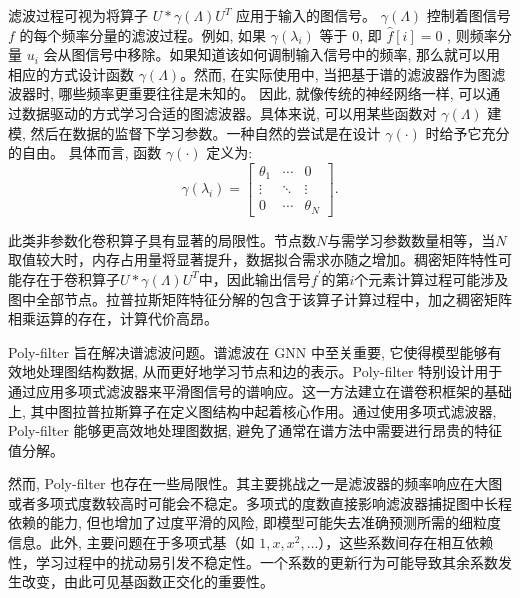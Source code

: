 滤波过程可视为将算子 \(U * \gamma \left( \Lambda \right) {U}^{T}\) 应用于输入的图信号。 \(\gamma \left( \Lambda \right)\) 控制着图信号 \(f\) 的每个频率分量的滤波过程。例如, 如果 \(\gamma \left( {\lambda }_{i}\right)\) 等于 0, 即 \(\widehat{f}\left\lbrack  {i}\right\rbrack   = 0\) , 则频率分量 \({u}_{i}\) 会从图信号中移除。如果知道该如何调制输入信号中的频率, 那么就可以用相应的方式设计函数 \(\gamma \left( \Lambda \right)\)。然而, 在实际使用中, 当把基于谱的滤波器作为图滤波器时, 哪些频率更重要往往是未知的。 因此, 就像传统的神经网络一样, 可以通过数据驱动的方式学习合适的图滤波器。具体来说, 可以用某些函数对 \(\gamma \left( \Lambda \right)\) 建模, 然后在数据的监督下学习参数。一种自然的尝试是在设计 \(\gamma \left( \cdot \right)\) 时给予它充分的自由。 具体而言, 函数 \(\gamma \left( \cdot \right)\) 定义为:
\begin{equation}
\gamma \left( {\lambda }_{i}\right)  = \left\lbrack  \begin{matrix} {\theta }_{1} & \cdots & 0 \\  \vdots &  \ddots  & \vdots \\  0 & \cdots & {\theta }_{N} \end{matrix}\right\rbrack.
\end{equation}

此类非参数化卷积算子具有显著的局限性。节点数\({N}\)与需学习参数数量相等，当\({N}\)取值较大时，内存占用量将显著提升，数据拟合需求亦随之增加。稠密矩阵特性可能存在于卷积算子\(U * \gamma \left( \Lambda \right) {U}^{T}\)中，因此输出信号\({f}^{\prime }\)的第\({i}\)个元素计算过程可能涉及图中全部节点。拉普拉斯矩阵特征分解的包含于该算子计算过程中，加之稠密矩阵相乘运算的存在，计算代价高昂。

Poly-filter \parencite{2021_Han_Dynamic_and_multi_faceted_spatio_temporal_deep_learning_for_traffic_speed_forecasting} 旨在解决谱滤波问题。谱滤波在 GNN 中至关重要, 它使得模型能够有效地处理图结构数据, 从而更好地学习节点和边的表示。Poly-filter 特别设计用于通过应用多项式滤波器来平滑图信号的谱响应。这一方法建立在谱卷积框架的基础上, 其中图拉普拉斯算子在定义图结构中起着核心作用。通过使用多项式滤波器, Poly-filter 能够更高效地处理图数据, 避免了通常在谱方法中需要进行昂贵的特征值分解。

然而, Poly-filter 也存在一些局限性。其主要挑战之一是滤波器的频率响应在大图或者多项式度数较高时可能会不稳定。多项式的度数直接影响滤波器捕捉图中长程依赖的能力, 但也增加了过度平滑的风险, 即模型可能失去准确预测所需的细粒度信息。此外, 主要问题在于多项式基（如 \(1, {x}, {{x}}^{2}, \ldots\)），这些系数间存在相互依赖性，学习过程中的扰动易引发不稳定性。一个系数的更新行为可能导致其余系数发生改变，由此可见基函数正交化的重要性。

